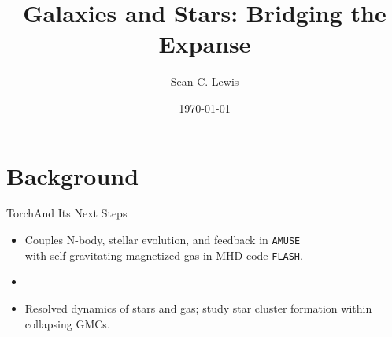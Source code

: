 \documentclass[aspectratio=169]{beamer}
\author{Sean C. Lewis}
\title{Galaxies and Stars: Bridging the Expanse}
\date{\today}
\begin{document}
\titlepage

\section{Background}
%
\begin{frame}{Torch}{And Its Next Steps}
    \begin{itemize}
        \item Couples N-body, stellar evolution, and feedback in \texttt{AMUSE} \\ with self-gravitating magnetized gas in MHD code \texttt{FLASH}.
        \item []
        \item Resolved dynamics of stars and gas; study star cluster formation within collapsing GMCs.
    \end{itemize}
\end{frame}
\end{document}
